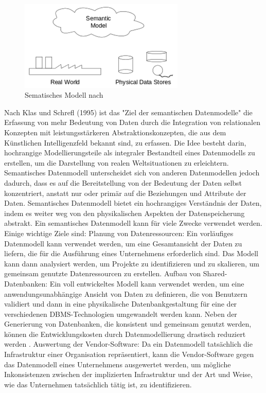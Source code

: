 \begin{figure}[htp]
\centering
\includegraphics[width=0.7\textwidth]{images/SemanticModel.png}
\caption{Sematisches Modell nach \cite{rishe1992}}
\label{oo-example}
\end{figure}


Nach Klas und Schrefl (1995) ist das "{}Ziel der semantischen Datenmodelle"{} die Erfassung von mehr Bedeutung von Daten durch die Integration von relationalen Konzepten mit leistungsstärkeren Abstraktionskonzepten, die aus dem Künstlichen Intelligenzfeld bekannt sind, zu erfassen. Die Idee besteht darin, hochrangige Modellierungsteile als integraler Bestandteil eines Datenmodells zu erstellen, um die Darstellung von realen Weltsituationen zu erleichtern.
Semantisches Datenmodell unterscheidet sich von anderen Datenmodellen jedoch dadurch, dass es auf die Bereitstellung von der Bedeutung der Daten selbst konzentriert, anstatt nur oder primär auf die Beziehungen und Attribute der Daten.
Semantisches Datenmodell bietet ein hochrangiges Verständnis der Daten, indem es weiter weg von den physikalischen Aspekten der Datenspeicherung abstrakt. \cite{bekke2005}
Ein semantisches Datenmodell kann für viele Zwecke verwendet werden. Einige wichtige Ziele sind:
Planung von Datenressourcen: Ein vorläufiges Datenmodell kann verwendet werden, um eine Gesamtansicht der Daten zu liefern, die für die Ausführung eines Unternehmens erforderlich sind. Das Modell kann dann analysiert werden, um Projekte zu identifizieren und zu skalieren, um gemeinsam genutzte Datenressourcen zu erstellen.
Aufbau von Shared-Datenbanken: Ein voll entwickeltes Modell kann verwendet werden, um eine anwendungsunabhängige Ansicht von Daten zu definieren, die von Benutzern validiert und dann in eine physikalische Datenbankgestaltung für eine der verschiedenen DBMS-Technologien umgewandelt werden kann. Neben der Generierung von Datenbanken, die konsistent und gemeinsam genutzt werden, können die Entwicklungskosten durch Datenmodellierung drastisch reduziert werden \cite{rishe1992}.
Auswertung der Vendor-Software: Da ein Datenmodell tatsächlich die Infrastruktur einer Organisation repräsentiert, kann die Vendor-Software gegen das Datenmodell eines Unternehmens ausgewertet werden, um mögliche Inkonsistenzen zwischen der implizierten Infrastruktur und der Art und Weise, wie das Unternehmen tatsächlich tätig ist, zu identifizieren.
